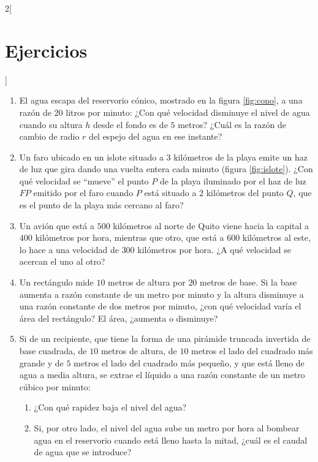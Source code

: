 \begin{multicols}{2}[\section{Ejercicios}]
\begingroup\small
\begin{enumerate}[leftmargin=*]
\item\label{ex:dcRCCono} El agua escapa del reservorio cónico, mostrado en la figura
    \ref{fig:cono}, a una razón de $20$ litros por minuto: ¿Con qué velocidad disminuye el
    nivel de agua cuando su altura $h$ desde el fondo es de $5$ metros? ¿Cuál es la razón de
    cambio de radio $r$ del espejo del agua en ese instante?

\item\label{ex:dcRCIslote} Un faro ubicado en un islote situado a $3$ kilómetros de la playa
    emite un haz de luz que gira dando una vuelta entera cada minuto (figura \ref{fig:islote}).
    ¿Con qué velocidad se ``mueve'' el punto $P$ de la playa iluminado por el haz de luz $FP$
    emitido por el faro cuando $P$ está situado a $2$ kilómetros del punto $Q$, que es el punto
    de la playa más cercano al faro?

\item Un avión que está a $500$ kilómetros al norte de Quito viene hacia la capital a $400$
    kilómetros por hora, mientras que otro, que está a $600$ kilómetros al este, lo hace a una
    velocidad de $300$ kilómetros por hora. ¿A qué velocidad se acercan el uno al otro?

\item Un rectángulo mide $10$ metros de altura por $20$ metros de base. Si la base aumenta a
    razón constante de un metro por minuto y la altura disminuye a una razón constante de dos
    metros por minuto, ¿con qué velocidad varía el área del rectángulo? El área, ¿aumenta o
    disminuye?

\item Si de un recipiente, que tiene la forma de una pirámide truncada invertida de base
    cuadrada, de $10$ metros de altura, de $10$ metros el lado del cuadrado más grande y de $5$
    metros el lado del cuadrado más pequeño, y que está lleno de agua a media altura, se extrae
    el líquido a una razón constante de un metro cúbico por minuto:
    \begin{enumerate}[leftmargin=*]
    \item ¿Con qué rapidez baja el nivel del agua?
    \item Si, por otro lado, el nivel del agua sube un metro por hora al bombear agua en el
        reservorio cuando está lleno hasta la mitad, ¿cuál es el caudal de agua que se
        introduce?
    \end{enumerate}


\end{enumerate}
\end{multicols}
